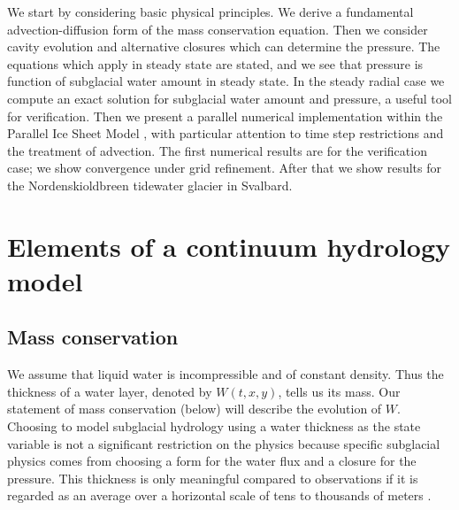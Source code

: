 \documentclass[11pt,final]{amsart}
\begin{document}
We start by considering basic physical principles.  We derive a fundamental advection-diffusion form of the mass conservation equation.  Then we consider cavity evolution and alternative closures which can determine the pressure.  The equations which apply in steady state are stated, and we see that pressure is function of subglacial water amount in steady state.  In the steady radial case we compute an exact solution for subglacial water amount and pressure, a useful tool for verification.  Then we present a parallel numerical implementation within the Parallel Ice Sheet Model \citep{pism-user-manual}, with particular attention to time step restrictions and the treatment of advection.  The first numerical results are for the verification case; we show convergence under grid refinement.  After that we show results for the Nordenskioldbreen tidewater glacier in Svalbard.


\section{Elements of a continuum hydrology model}

\subsection*{Mass conservation}  We assume that liquid water is incompressible and of constant density.  Thus the thickness of a water layer, denoted by $W(t,x,y)$, tells us its mass.  Our statement of mass conservation (below) will describe the evolution of $W$.  Choosing to model subglacial hydrology using a water thickness as the state variable is not a significant restriction on the physics because specific subglacial physics comes from choosing a form for the water flux and a closure for the pressure.  This thickness is only meaningful compared to observations if it is regarded as an average over a horizontal scale of tens to thousands of meters \citep{FlowersClarke2002_theory}.
\end{document}
